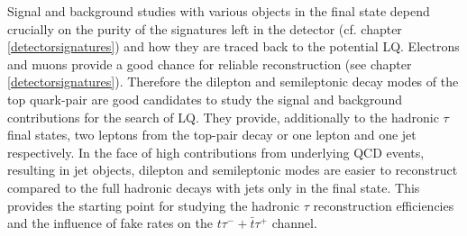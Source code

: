 Signal and background studies with various objects in the final state depend crucially on the purity of the signatures left in the detector (cf. chapter \ref{detectorsignatures}) and how they are traced back to the potential LQ. Electrons and muons provide a good chance for reliable reconstruction (see chapter \ref{detectorsignatures}). Therefore the dilepton and semileptonic decay modes of the top quark-pair are good candidates to study the signal and background contributions for the search of LQ. They provide, additionally to the hadronic $\tau$ final states, two leptons from the top-pair decay or one lepton and one jet respectively. In the face of high contributions from underlying QCD events, resulting in jet objects, dilepton and semileptonic modes are easier to reconstruct compared to the full hadronic decays with jets only in the final state. This provides the starting point for studying the hadronic $\tau$ reconstruction efficiencies and the influence of fake rates on the $t\tau^{-}+\bar{t}\tau^{+}$ channel.
%
